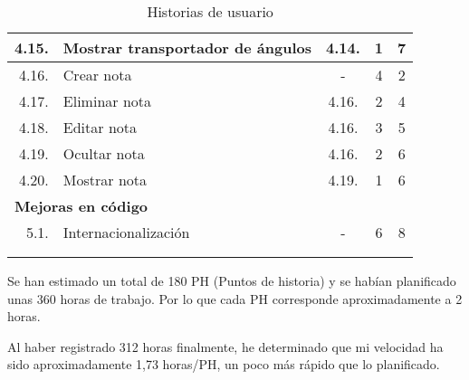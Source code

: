 \begin{longtable} {r l c c c}
	\hline
	4.15.	&	Mostrar transportador de ángulos	&	4.14.			&	1				&	7	\\
	\hline
	4.16.	&	Crear nota							&	-				&	4				&	2	\\
	\hline
	4.17.	&	Eliminar nota						&	4.16.			&	2				&	4	\\
	\hline
	4.18.	&	Editar nota							&	4.16.			&	3				&	5	\\
	\hline
	4.19.	&	Ocultar nota						&	4.16.			&	2				&	6	\\
	\hline
	4.20.	&	Mostrar nota						&	4.19.			&	1				&	6	\\
	\hline
	\multicolumn{5}{l}{\textbf{Mejoras en código}} \\
	\hline
	5.1.	&	Internacionalización				&	-				&	6				&	8	\\
	\hline
	\\
	\caption{Historias de usuario}
	\label{tab:analisis/hus}
\end{longtable}

Se han estimado un total de 180 PH (Puntos de historia) y se habían planificado unas 360 horas de trabajo. Por lo que cada PH corresponde aproximadamente a 2 horas.

Al haber registrado 312 horas finalmente, he determinado que mi velocidad ha sido aproximadamente 1,73 horas/PH, un poco más rápido que lo planificado.